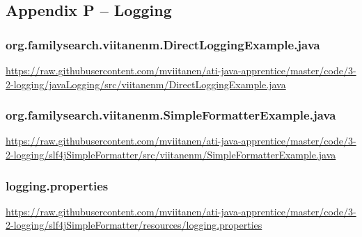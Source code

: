 \subsection*{Appendix P -- Logging} \label{App:AppendixP}

\subsubsection*{org.familysearch.viitanenm.DirectLoggingExample.java}
\noindent
\begin{minipage}{.6in}
\end{minipage}
\begin{minipage}{6in}
  \url{https://raw.githubusercontent.com/mviitanen/ati-java-apprentice/master/code/3-2-logging/javaLogging/src/viitanenm/DirectLoggingExample.java}
\end{minipage}

\vspace{1em}
\subsubsection*{org.familysearch.viitanenm.SimpleFormatterExample.java}
\noindent
\begin{minipage}{.6in}
\end{minipage}
\begin{minipage}{6in}
  \url{https://raw.githubusercontent.com/mviitanen/ati-java-apprentice/master/code/3-2-logging/slf4jSimpleFormatter/src/viitanenm/SimpleFormatterExample.java}
\end{minipage}

\vspace{1em}
\subsubsection*{logging.properties}
\noindent
\begin{minipage}{.6in}
\end{minipage}
\begin{minipage}{6in}
  \url{https://raw.githubusercontent.com/mviitanen/ati-java-apprentice/master/code/3-2-logging/slf4jSimpleFormatter/resources/logging.properties}
\end{minipage}


